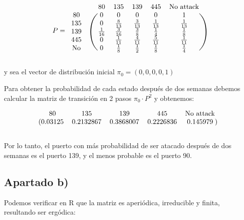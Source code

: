 \documentclass[11pt]{article}
\begin{document}
\begin{equation*}
  P = 
  \begin{blockarray}{ccccccc}
    & & 80 & 135 & 139 & 445 & \text{No attack} \\
    \begin{block}{cc(ccccc)}
      80        & & 0            & 0            & 0            & 0            & 1 \\
      135       & & 0            & \frac{8}{13} & \frac{3}{13} & \frac{1}{13} & \frac{1}{13} \\
      139       & & \frac{1}{16} & \frac{3}{16} & \frac{3}{8}  & \frac{1}{4}  & \frac{1}{8} \\
      445       & & 0            & \frac{1}{11} & \frac{4}{11} & \frac{5}{11} & \frac{1}{11} \\
      \text{No} & & 0            & \frac{1}{8}  & \frac{1}{2}  & \frac{1}{8}  & \frac{1}{4} \\
    \end{block}
  \end{blockarray}
\end{equation*}

y sea el vector de distribución inicial $\pi_0 = (0, 0, 0, 0, 1)$

Para obtener la probabilidad de cada estado después de dos semanas debemos calcular
la matriz de transición en 2 pasos $\pi_0 \cdot P^2$ y obtenemos:

\begin{equation*}
  \begin{blockarray}{ccccc}
    80 & 135 & 139 & 445 & \text{No attack} \\
    \begin{block}{(ccccc)}
      0.03125 & 0.2132867 & 0.3868007 & 0.2226836 & 0.145979 \\
    \end{block}
  \end{blockarray}
\end{equation*}

Por lo tanto, el puerto con más probabilidad de ser atacado después de dos semanas
es el puerto 139, y el menos probable es el puerto 90.


\subsection*{Apartado b)}

Podemos verificar en R que la matriz es aperiódica, irreducible y finita, 
resultando ser ergódica:
\end{document}
